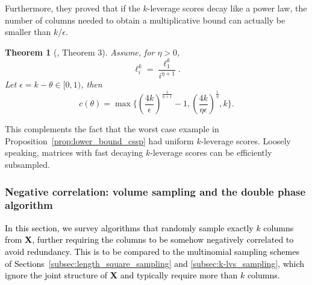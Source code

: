 \documentclass[twoside,11pt]{book}
\newcommand{\rev}[1]{\textcolor{black}{#1}}
\newtheorem{theorem}{Theorem}
\numberwithin{theorem}{chapter}
\numberwithin{definition}{chapter}
\numberwithin{proposition}{chapter}
\numberwithin{corollary}{chapter}
\numberwithin{example}{chapter}
\numberwithin{lemma}{chapter}
\numberwithin{assumption}{chapter}
\numberwithin{equation}{chapter}
\numberwithin{figure}{chapter}
\begin{document}
Furthermore, they proved that if the $k$-leverage scores decay like a power law, the number of columns needed to obtain a multiplicative bound can actually be smaller than $k/\epsilon$.
\begin{theorem}[\citealp{PaKyBo14}, Theorem 3]
Assume, for $\eta > 0$,
\begin{equation}\label{eq:power_law_leverage_scores}
\ell_{i}^{k} = \frac{\ell_{1}^{k}}{i^{\eta +1}}.
\end{equation}
Let $\epsilon = k-\theta\in [0,1)$, then
\begin{equation}
c(\theta) = \max \bigg\{ \left(\frac{4k}{\epsilon}\right)^{\frac{1}{\eta + 1}} - 1, \left(\frac{4k}{\eta \epsilon}\right)^{\frac{1}{\eta}}, k \bigg\}.
\end{equation}
\end{theorem}
This complements the fact that the worst case example in Proposition~\ref{prop:lower_bound_cssp} had uniform $k$-leverage scores. Loosely speaking, matrices with fast decaying $k$-leverage scores can be efficiently subsampled.


 \subsubsection{Negative correlation: volume sampling and the double phase algorithm}\label{subsec:volume_sampling}
 \rev{
 In this section, we survey algorithms that randomly sample exactly $k$ columns from $\bm{X}$, further requiring the columns to be somehow negatively correlated to avoid redundancy. This is to be compared to the multinomial sampling schemes of Sections~\ref{subsec:length_square_sampling} and \ref{subsec:k-lvs_sampling}, which ignore the joint structure of $\bm{X}$ and typically require more than $k$ columns.
}
\end{document}

